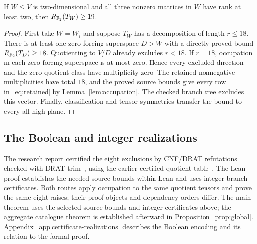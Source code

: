 \begin{corollary}\label{cor:raises}
If $W\leq V$ is two-dimensional and all three nonzero matrices in $W$
have rank at least two, then $R_{\mathbb F_2}(T_W)\geq19$.
\end{corollary}
\begin{proof}
First take $W=W_i$ and suppose $T_W$ has a decomposition of length
$r\leq18$. There is at least one zero-forcing superspace $D>W$
with a directly proved bound $R_{\mathbb F_2}(T_D)\geq18$. Quotienting to
$V/D$ already excludes $r<18$. If $r=18$, occupation in each
zero-forcing superspace is at most zero. Hence every excluded direction
and the zero quotient class have multiplicity zero. The retained
nonnegative multiplicities have total $18$, and the proved source
bounds give every row in~\eqref{eq:retained} by
Lemma~\ref{lem:occupation}. The checked branch tree excludes this
vector. Finally, classification and tensor symmetries transfer the
bound to every all-high plane.
\end{proof}

\subsection{The Boolean and integer realizations}
The research report certified the eight exclusions by CNF/DRAT
refutations checked with DRAT-trim~\cite{drat-trim}, using the earlier
certified quotient table~\cite{qiushi-report}.
The Lean proof establishes the needed source bounds within Lean
and uses integer branch certificates.
Both routes apply occupation to the same quotient tensors and prove
the same eight raises; their proof objects and dependency orders differ.
The main theorem uses the selected source bounds and integer
certificates above; the aggregate catalogue theorem is established
afterward in Proposition~\ref{prop:global}. Appendix~\ref{app:certificate-realizations}
describes the Boolean encoding and its relation to the formal proof.
